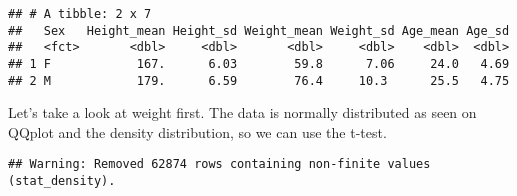 \documentclass[
]{article}
\newenvironment{Shaded}{\begin{snugshade}}{\end{snugshade}}
\newcommand{\AttributeTok}[1]{\textcolor[rgb]{0.77,0.63,0.00}{#1}}
\newcommand{\CommentTok}[1]{\textcolor[rgb]{0.56,0.35,0.01}{\textit{#1}}}
\newcommand{\DecValTok}[1]{\textcolor[rgb]{0.00,0.00,0.81}{#1}}
\newcommand{\FloatTok}[1]{\textcolor[rgb]{0.00,0.00,0.81}{#1}}
\newcommand{\FunctionTok}[1]{\textcolor[rgb]{0.00,0.00,0.00}{#1}}
\newcommand{\NormalTok}[1]{#1}
\newcommand{\SpecialCharTok}[1]{\textcolor[rgb]{0.00,0.00,0.00}{#1}}
\newcommand{\StringTok}[1]{\textcolor[rgb]{0.31,0.60,0.02}{#1}}
\begin{document}
\begin{verbatim}
## # A tibble: 2 x 7
##   Sex   Height_mean Height_sd Weight_mean Weight_sd Age_mean Age_sd
##   <fct>       <dbl>     <dbl>       <dbl>     <dbl>    <dbl>  <dbl>
## 1 F            167.      6.03        59.8      7.06     24.0   4.69
## 2 M            179.      6.59        76.4     10.3      25.5   4.75
\end{verbatim}

Let's take a look at weight first. The data is normally distributed as
seen on QQplot and the density distribution, so we can use the t-test.

\begin{Shaded}
\end{Shaded}

\begin{verbatim}
## Warning: Removed 62874 rows containing non-finite values (stat_density).
\end{verbatim}
\end{document}
